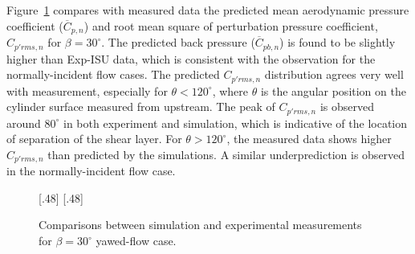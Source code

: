 Figure~\ref{fig:Cp_Compared_Yawed_Exp-ISU} compares with measured data the
predicted mean aerodynamic pressure coefficient ($\overline{C}_{p,n}$) and root
mean square of perturbation pressure coefficient, $C_{p'rms,n}$ for
$\beta=30^\circ$. The predicted back pressure ($\overline{C}_{pb,n}$) is found
to be slightly higher than Exp-ISU data, which is consistent with the
observation for the normally-incident flow cases. The predicted $C_{p'rms,n}$
distribution agrees very well with measurement, especially for
$\theta<120^\circ$, where $\theta$ is the angular position on the cylinder
surface measured from upstream. The peak of $C_{p'rms,n}$ is observed around
$80^\circ$ in both experiment and simulation, which is indicative of the
location of separation of the shear layer. For $\theta > 120^\circ$, the
measured data shows higher $C_{p'rms,n}$ than predicted by the simulations. A
similar underprediction is observed in the normally-incident flow case.
%
\begin{figure}[htb!]
  \centering
    [.48\linewidth]{}
  \hspace*{\fill}
    [.48\linewidth]{}
  \caption{Comparisons between simulation and experimental measurements for
    $\beta=30^\circ$ yawed-flow case.}
\label{fig:Cp_Compared_Yawed_Exp-ISU}
\end{figure}

